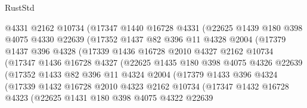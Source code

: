 \begin{lexlean}{RustStd}
\begin{coremodule}
                  @4331
                  @2162
                  @10734
                  (@17347
                    @1440
                    @16728
                    @4331
                    (@22625
                      @1439
                      @180
                      @398
                      @4075
                      @4330
                      @22639
                      (@17352
                        @1437
                        @82
                        @396
                        @11
                        @4328
                        @2004
                        (@17379
                          @1437
                          @396
                          @4328
                          (@17339
                            @1436
                            @16728
                            @2010
                            @4327
                            @2162
                            @10734
                            (@17347
                              @1436
                              @16728
                              @4327
                              (@22625
                                @1435
                                @180
                                @398
                                @4075
                                @4326
                                @22639
                                (@17352
                                  @1433
                                  @82
                                  @396
                                  @11
                                  @4324
                                  @2004
                                  (@17379
                                    @1433
                                    @396
                                    @4324
                                    (@17339
                                      @1432
                                      @16728
                                      @2010
                                      @4323
                                      @2162
                                      @10734
                                      (@17347
                                        @1432
                                        @16728
                                        @4323
                                        (@22625
                                          @1431
                                          @180
                                          @398
                                          @4075
                                          @4322
                                          @22639

\end{coremodule}
\end{lexlean}
